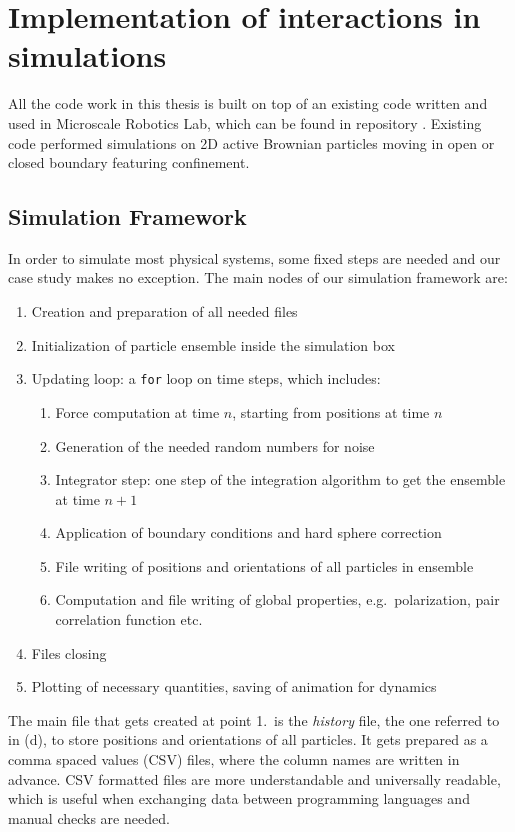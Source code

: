 \documentclass[../../master_thesis_np.tex]{subfiles}
\begin{document}
\chapter[Interaction Implementation]{Implementation of interactions in simulations}
\label{chap:int_impl}

	All the code work in this thesis is built on top of an existing code written and used in Microscale Robotics Lab, which can be found in repository \cite{sharma_simulations_2023}. Existing code performed simulations on 2D active Brownian particles moving in open or closed boundary featuring confinement. 

	\section{Simulation Framework}
	In order to simulate most physical systems, some fixed steps are needed and our case study makes no exception. The main nodes of our simulation framework are:
	\begin{enumerate}
		\item Creation and preparation of all needed files
		\item Initialization of particle ensemble inside the simulation box
		\item Updating loop: a \verb|for| loop on time steps, which includes:
		\begin{enumerate}
			\item Force computation at time $n$, starting from positions at time $n$
			\item Generation of the needed random numbers for noise
			\item Integrator step: one step of the integration algorithm to get the ensemble at time $n+1$
			\item Application of boundary conditions and hard sphere correction 
			\item File writing of positions and orientations of all particles in ensemble
			\item Computation and file writing of global properties, e.g.\ polarization, pair correlation function etc.
		\end{enumerate}
		\item Files closing
		\item Plotting of necessary quantities, saving of animation for dynamics
	\end{enumerate}
	
	The main file that gets created at point 1.\ is the \emph{history} file, the one referred to in (d), to store positions and orientations of all particles. It gets prepared as a comma spaced values (CSV) files, where the column names are written in advance. CSV formatted files are more understandable and universally readable, which is useful when exchanging data between programming languages and manual checks are needed.
	
\end{document}
